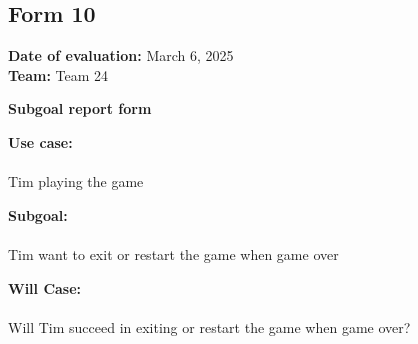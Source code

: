 \documentclass[12pt, titlepage]{article}
\begin{document}
\subsection{Form 10}

\noindent \textbf{Date of evaluation:} March 6, 2025\\
\textbf{Team:} Team 24

\vspace{0.5cm}
\noindent \textbf{\large Subgoal report form}

\vspace{0.3cm}
\noindent \textbf{Use case:} \\\\
Tim playing the game


\vspace{0.5cm}
\noindent \textbf{Subgoal:} \\\\
Tim want to exit or restart the game when game over

\vspace{0.5cm}
\noindent \textbf{Will Case:} \\\\
Will Tim succeed in exiting or restart the game when game over?
\end{document}
